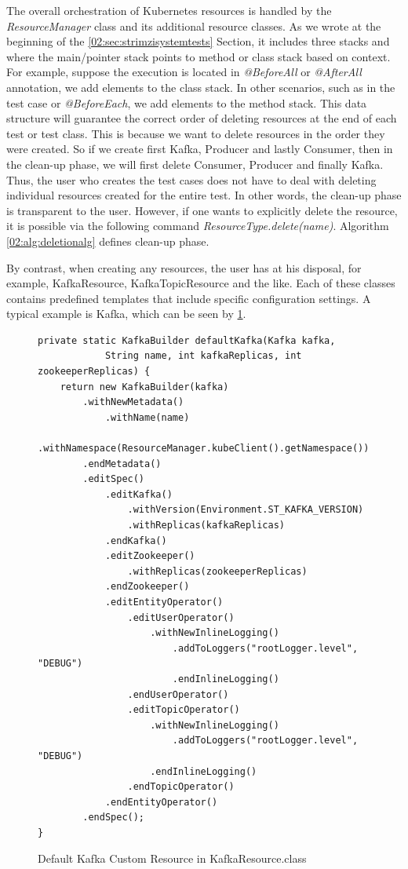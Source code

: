 The overall orchestration of Kubernetes resources is handled by the \emph{ResourceManager} class and its additional resource classes. As we wrote at the beginning of the \ref{02:sec:strimzisystemtests} Section, it includes three stacks and where the main/pointer stack points to method or class stack based on context. For example, suppose the execution is located in \emph{@BeforeAll} or \emph{@AfterAll} annotation, we add elements to the class stack. In other scenarios, such as in the test case or \emph{@BeforeEach}, we add elements to the method stack. This data structure will guarantee the correct order of deleting resources at the end of each test or test class. This is because we want to delete resources in the order they were created. So if we create first Kafka, Producer and lastly Consumer, then in the clean-up phase, we will first delete Consumer, Producer and finally Kafka. Thus, the user who creates the test cases does not have to deal with deleting individual resources created for the entire test. In other words, the clean-up phase is transparent to the user. However, if one wants to explicitly delete the resource, it is possible via the following command \emph{ResourceType.delete(name)}. Algorithm \ref{02:alg:deletionalg} defines clean-up phase.


By contrast, when creating any resources, the user has at his disposal, for example, KafkaResource, KafkaTopicResource and the like. Each of these classes contains predefined templates that include specific configuration settings. A typical example is Kafka, which can be seen by \ref{02:fig:kafkaresource:defaultmethod}.

\begin{figure}[!ht]
\begin{lstlisting}
private static KafkaBuilder defaultKafka(Kafka kafka,
            String name, int kafkaReplicas, int zookeeperReplicas) {
    return new KafkaBuilder(kafka)
        .withNewMetadata()
            .withName(name)
            .withNamespace(ResourceManager.kubeClient().getNamespace())
        .endMetadata()
        .editSpec()
            .editKafka()
                .withVersion(Environment.ST_KAFKA_VERSION)
                .withReplicas(kafkaReplicas)
            .endKafka()
            .editZookeeper()
                .withReplicas(zookeeperReplicas)
            .endZookeeper()
            .editEntityOperator()
                .editUserOperator()
                    .withNewInlineLogging()
                        .addToLoggers("rootLogger.level", "DEBUG")
                        .endInlineLogging()
                .endUserOperator()
                .editTopicOperator()
                    .withNewInlineLogging()
                        .addToLoggers("rootLogger.level", "DEBUG")
                    .endInlineLogging()
                .endTopicOperator()
            .endEntityOperator()
        .endSpec();
}
\end{lstlisting}
    \caption{Default Kafka Custom Resource in KafkaResource.class}
    \label{02:fig:kafkaresource:defaultmethod}
\end{figure}

